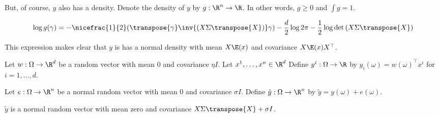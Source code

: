 But, of course, $y$ also has a density.
Denote the density of $y$ by $g: \R^n \to \R$.
In other words, $g \geq 0$ and $\int g = 1$.

\begin{proposition}
  \[
    \log g(\gamma) = -\nicefrac{1}{2}(\transpose{\gamma}\inv{\left(X\Sigma\transpose{X}\right)}\gamma) - \frac{d}{2}\log 2\pi - \frac{1}{2}\log\det\left(X\Sigma\transpose{X}\right)
  \]
\end{proposition}




This expression makes clear that $y$ is has a normal density with mean $X\E(x)$ and covariance $X\E(x)X^{\top}$.

Let $w: \Omega \to \R^d$ be a random vector with mean $0$ and covariance $\eta I$.
Let $x^1, \dots, x^n \in \R^d$
Define $y^i: \Omega \to \R$ by $y_i(\omega) = w(\omega)^\top x^i$ for $i = 1, \dots, d$.


Let $e: \Omega \to \R^n$ be a normal random vector with mean $0$ and covariance $\sigma I$.
Define $\tilde{y}:\Omega\to\R^n$ by $\tilde{y} = y(\omega) + e(\omega)$.

\begin{proposition}
  $\tilde{y}$ is a normal random vector with mean zero and covariance $X \Sigma \transpose{X} + \sigma I$.
\end{proposition}

\blankpage
